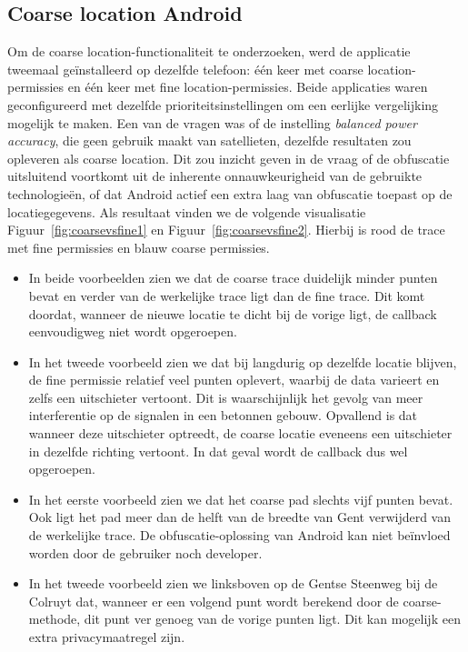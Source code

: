 \subsection{Coarse location Android}
Om de coarse location-functionaliteit te onderzoeken, werd de applicatie tweemaal geïnstalleerd op dezelfde telefoon: één keer met coarse location-permissies en één keer met fine location-permissies. Beide applicaties waren geconfigureerd met dezelfde prioriteitsinstellingen om een eerlijke vergelijking mogelijk te maken. Een van de vragen was of de instelling \textit{balanced power accuracy}, die geen gebruik maakt van satellieten, dezelfde resultaten zou opleveren als coarse location. 
Dit zou inzicht geven in de vraag of de obfuscatie uitsluitend voortkomt uit de inherente onnauwkeurigheid van de gebruikte technologieën, of dat Android actief een extra laag van obfuscatie toepast op de locatiegegevens.
Als resultaat vinden we de volgende visualisatie Figuur~\ref{fig:coarsevsfine1} en Figuur~\ref{fig:coarsevsfine2}. Hierbij is rood de trace met fine permissies en blauw coarse permissies. 
\begin{itemize}
    \item In beide voorbeelden zien we dat de coarse trace duidelijk minder punten bevat en verder van de werkelijke trace ligt dan de fine trace. Dit komt doordat, wanneer de nieuwe locatie te dicht bij de vorige ligt, de callback eenvoudigweg niet wordt opgeroepen.
    \item In het tweede voorbeeld zien we dat bij langdurig op dezelfde locatie blijven, de fine permissie relatief veel punten oplevert, waarbij de data varieert en zelfs een uitschieter vertoont. Dit is waarschijnlijk het gevolg van meer interferentie op de signalen in een betonnen gebouw. Opvallend is dat wanneer deze uitschieter optreedt, de coarse locatie eveneens een uitschieter in dezelfde richting vertoont. In dat geval wordt de callback dus wel opgeroepen.
    \item In het eerste voorbeeld zien we dat het coarse pad slechts vijf punten bevat. Ook ligt het pad meer dan de helft van de breedte van Gent verwijderd van de werkelijke trace. De obfuscatie-oplossing van Android kan niet beïnvloed worden door de gebruiker noch developer.
    \item In het tweede voorbeeld zien we linksboven op de Gentse Steenweg bij de Colruyt dat, wanneer er een volgend punt wordt berekend door de coarse-methode, dit punt ver genoeg van de vorige punten ligt. Dit kan mogelijk een extra privacymaatregel zijn.
\end{itemize}
